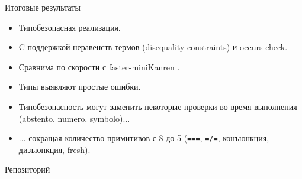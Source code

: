 \documentclass[10pt, mathserif]{beamer}
\theoremstyle{definition}
\begin{document}
\begin{frame}[fragile]{Итоговые результаты}

\begin{itemize}
 \item Типобезопасная реализация.
 \item C поддержкой неравенств термов (disequality constraints) и occurs check.
 \item Сравнима по скорости с \href{https://github.com/michaelballantyne/faster-miniKanren/}{faster-miniKanren \faGithub}.
 \item Типы выявляют простые ошибки.
 \item Типобезопасность могут заменить некоторые проверки во время выполнения (abstento, numero, symbolo)...
 \item ... сокращая количество примитивов с 8 до 5 
 (\lstinline{===}, \lstinline{=/=}, конъюнкция, дизъюнкция, fresh).
\end{itemize}

\vskip 2cm
Репозиторий \href{https://github.com/dboulytchev/OCanren}{\faGithub}
\end{frame}
\end{document}
